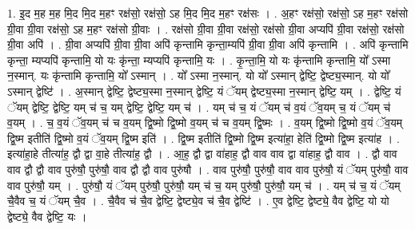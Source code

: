 \documentclass[17pt]{extarticle}
\begin{document}
1. इ॒द म॒ह म॒ह मि॒द मि॒द म॒हꣳ रक्ष॑सो॒ रक्ष॑सो॒ ऽह मि॒द मि॒द म॒हꣳ रक्ष॑सः । . अ॒हꣳ रक्ष॑सो॒ रक्ष॑सो॒ ऽह म॒हꣳ रक्ष॑सो ग्री॒वा ग्री॒वा रक्ष॑सो॒ ऽह म॒हꣳ रक्ष॑सो ग्री॒वाः । . रक्ष॑सो ग्री॒वा ग्री॒वा रक्ष॑सो॒ रक्ष॑सो ग्री॒वा अप्यपि॑ ग्री॒वा रक्ष॑सो॒ रक्ष॑सो ग्री॒वा अपि॑ । . ग्री॒वा अप्यपि॑ ग्री॒वा ग्री॒वा अपि॑ कृन्तामि कृन्ता॒म्यपि॑ ग्री॒वा ग्री॒वा अपि॑ कृन्तामि । . अपि॑ कृन्तामि कृन्ता॒ म्यप्यपि॑ कृन्तामि॒ यो यः कृ॑न्ता॒ म्यप्यपि॑ कृन्तामि॒ यः । . कृ॒न्ता॒मि॒ यो यः कृ॑न्तामि कृन्तामि॒ यो᳚ ऽस्मा न॒स्मान्. यः कृ॑न्तामि कृन्तामि॒ यो᳚ ऽस्मान् । . यो᳚ ऽस्मा न॒स्मान्. यो यो᳚ ऽस्मान् द्वेष्टि॒ द्वेष्ट्य॒स्मान्. यो यो᳚ ऽस्मान् द्वेष्टि॑ । . अ॒स्मान् द्वेष्टि॒ द्वेष्ट्य॒स्मा न॒स्मान् द्वेष्टि॒ यं ॅयम् द्वेष्ट्य॒स्मा न॒स्मान् द्वेष्टि॒ यम् । . द्वेष्टि॒ यं ॅयम् द्वेष्टि॒ द्वेष्टि॒ यम् च॑ च॒ यम् द्वेष्टि॒ द्वेष्टि॒ यम् च॑ । . यम् च॑ च॒ यं ॅयम् च॑ व॒यं ॅव॒यम् च॒ यं ॅयम् च॑ व॒यम् । . च॒ व॒यं ॅव॒यम् च॑ च व॒यम् द्वि॒ष्मो द्वि॒ष्मो व॒यम् च॑ च व॒यम् द्वि॒ष्मः । . व॒यम् द्वि॒ष्मो द्वि॒ष्मो व॒यं ॅव॒यम् द्वि॒ष्म इतीति॑ द्वि॒ष्मो व॒यं ॅव॒यम् द्वि॒ष्म इति॑ । . द्वि॒ष्म इतीति॑ द्वि॒ष्मो द्वि॒ष्म इत्या॑हा॒ हेति॑ द्वि॒ष्मो द्वि॒ष्म इत्या॑ह । . इत्या॑हा॒हे तीत्या॑ह॒ द्वौ द्वा वा॒हे तीत्या॑ह॒ द्वौ । . आ॒ह॒ द्वौ द्वा वा॑हाह॒ द्वौ वाव वाव द्वा वा॑हाह॒ द्वौ वाव । . द्वौ वाव वाव द्वौ द्वौ वाव पुरु॑षौ॒ पुरु॑षौ॒ वाव द्वौ द्वौ वाव पुरु॑षौ । . वाव पुरु॑षौ॒ पुरु॑षौ॒ वाव वाव पुरु॑षौ॒ यं ॅयम् पुरु॑षौ॒ वाव वाव पुरु॑षौ॒ यम् । . पुरु॑षौ॒ यं ॅयम् पुरु॑षौ॒ पुरु॑षौ॒ यम् च॑ च॒ यम् पुरु॑षौ॒ पुरु॑षौ॒ यम् च॑ । . यम् च॑ च॒ यं ॅयम् चै॒वैव च॒ यं ॅयम् चै॒व । . चै॒वैव च॑ चै॒व द्वेष्टि॒ द्वेष्ट्ये॒व च॑ चै॒व द्वेष्टि॑ । . ए॒व द्वेष्टि॒ द्वेष्ट्ये॒ वैव द्वेष्टि॒ यो यो द्वेष्ट्ये॒ वैव द्वेष्टि॒ यः । \newline
\end{document}
